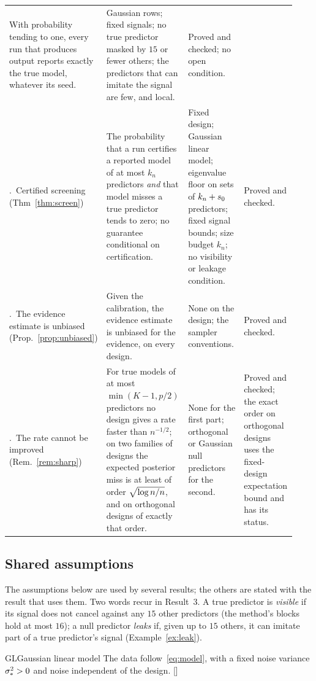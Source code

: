 \begin{table}[!t]
\begin{tabular}{@{}>{\raggedright\arraybackslash}p{0.17\linewidth}>{\raggedright\arraybackslash}p{0.3\linewidth}>{\raggedright\arraybackslash}p{0.26\linewidth}>{\raggedright\arraybackslash}p{0.2\linewidth}@{}}
With probability tending to one, every run that produces output reports exactly the true model, whatever its seed. &
Gaussian rows; fixed signals; no true predictor masked by $15$ or fewer others; the predictors that can imitate the
signal are few, and local. &
Proved and checked; no open condition. \\
4.~Certified screening (Thm~\ref{thm:screen}) &
The probability that a run certifies a reported model of at most $k_n$ predictors \emph{and} that model misses a true
predictor tends to zero; no guarantee conditional on certification. &
Fixed design; Gaussian linear model; eigenvalue floor on sets of $k_n+s_0$ predictors; fixed signal bounds; size
budget $k_n$; no visibility or leakage condition. &
Proved and checked. \\
5.~The evidence estimate is unbiased (Prop.~\ref{prop:unbiased}) &
Given the calibration, the evidence estimate is unbiased for the evidence, on every design. &
None on the design; the sampler conventions. &
Proved and checked. \\
6.~The rate cannot be improved (Rem.~\ref{rem:sharp}) &
For true models of at most $\min(K-1,p/2)$ predictors no design gives a rate faster than $n^{-1/2}$; on two
families of designs the expected posterior miss is at least of order $\sqrt{\log n/n}$, and on orthogonal designs of exactly that
order. &
None for the first part; orthogonal or Gaussian null predictors for the second. &
Proved and checked; the exact order on orthogonal designs uses the fixed-design expectation bound and has its
status. \\
\bottomrule
\end{tabular}
\end{table}

\subsection{Shared assumptions}\label{sec:standing}

The assumptions below are used by several results; the others are stated with the result that uses them. Two words recur
in Result~3. A true predictor is \emph{visible} if its signal does not cancel against any $15$ other predictors (the
method's blocks hold at most $16$); a null predictor \emph{leaks} if, given up to $15$ others, it can imitate part of a
true predictor's signal (Example~\ref{ex:leak}).

\begin{assumption}{GL}{Gaussian linear model}
The data follow~\eqref{eq:model}, with a fixed noise variance $\sigma_*^2>0$ and noise independent of the design. \hfill []
\end{assumption}

